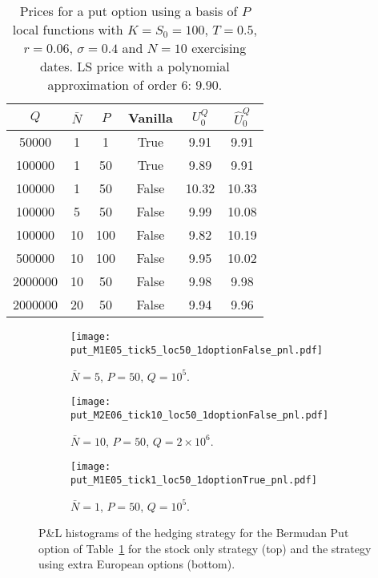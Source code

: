 \begin{table}[htbp!]
  \centering\begin{tabular}{cccccc}
 \hline
    $Q$ & $\bar{N}$ & $P$ & Vanilla\phantom{$\Big|$} &  $U_0^Q$ & $\hat{U}_0^Q$ \\
    \hline
    50000 & 1 & 1 & True & 9.91 & 9.91 \\
    100000 & 1 & 50 & True & 9.89 & 9.91 \\
    100000 & 1 & 50 & False & 10.32 & 10.33 \\
    100000 & 5 & 50 & False & 9.99 & 10.08 \\
    100000 & 10 & 100 & False & 9.82 & 10.19 \\
    500000 & 10 & 100 & False & 9.95 & 10.02 \\
    2000000 & 10 & 50 & False & 9.98 & 9.98 \\
    2000000 & 20 & 50 & False & 9.94 & 9.96 \\
    \hline
    \end{tabular}
  \caption{Prices for a put option using a basis of $P$ local functions with $K = S_0 = 100$, $T = 0.5$, $r=0.06$, $\sigma=0.4$ and $N=10$ exercising dates. LS price with a polynomial approximation of order 6: $9.90$. \label{Table:Put_local}}
\end{table}



\begin{figure}[h!]
  \begin{subfigure}{0.5\textwidth}
    \texttt{[image: put\_M1E05\_tick5\_loc50\_1doptionFalse\_pnl.pdf]}\caption{$\bar{N}=5$, $P=50$, $Q=10^5$.}\label{fig:Put_local_a}
  \end{subfigure}
  \begin{subfigure}{0.5\textwidth}
    \texttt{[image: put\_M2E06\_tick10\_loc50\_1doptionFalse\_pnl.pdf]}\caption{$\bar{N}=10$, $P=50$, $Q=2\times 10^6$.}\label{fig:Put_local_b}
  \end{subfigure} 
  \begin{center}
    \begin{subfigure}{0.5\textwidth}
      \texttt{[image: put\_M1E05\_tick1\_loc50\_1doptionTrue\_pnl.pdf]}\caption{$\bar{N}=1$, $P=50$, $Q=10^5$.}\label{fig:Put_local_c}
  \end{subfigure}
  \end{center}
  \caption{P\&L histograms of the hedging strategy for the Bermudan Put option of Table~\ref{Table:Put_local} for the stock only strategy (top) and the strategy using extra European options (bottom). } \label{fig:Put_local}
\end{figure}

